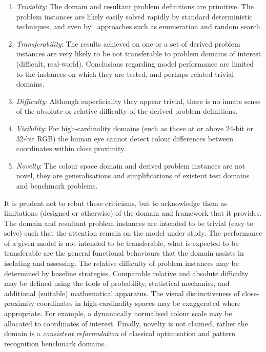 \begin{enumerate}
	\item \emph{Triviality}: The domain and resultant problem definitions are primitive. The problem instances are likely easily solved rapidly by standard deterministic techniques, and even by \naive\ approaches such as enumeration and random search.
	\item \emph{Transferability}: The results achieved on one or a set of derived problem instances are very likely to be not transferable to problem domains of interest (difficult, real-world). Conclusions regarding model performance are limited to the instances on which they are tested, and perhaps related trivial domains.
	\item \emph{Difficulty}: Although superficiality they appear trivial, there is no innate sense of the absolute or relative difficulty of the derived problem definitions.
	\item \emph{Visibility}: For high-cardinality domains (such as those at or above 24-bit or 32-bit RGB) the human eye cannot detect colour differences between coordinates within close proximity.
	\item \emph{Novelty}: The colour space domain and derived problem instances are not novel, they are generalisations and simplifications of existent test domains and benchmark problems.
\end{enumerate}

It is prudent not to rebut these criticisms, but to acknowledge them as limitations (designed or otherwise) of the domain and framework that it provides. The domain and resultant problem instances are intended to be trivial (easy to solve) such that the attention remain on the model under study. The performance of a given model is not intended to be transferable, what is expected to be transferable are the general functional behaviours that the domain assists in isolating and assessing. The relative difficulty of problem instances may be determined by baseline strategies. Comparable relative and absolute difficulty may be defined using the tools of probability, statistical mechanics, and additional (suitable) mathematical apparatus. The visual distinctiveness of close-proximity coordinates in high-cardinality spaces may be exaggerated where appropriate. For example, a dynamically normalised colour scale may be allocated to coordinates of interest. Finally, novelty is not claimed, rather the domain is a \emph{consistent reformulation} of classical optimisation and pattern recognition benchmark domains.

